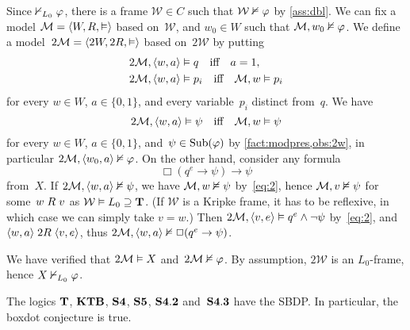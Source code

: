 \documentclass[leqno,draft,11pt]{article}
\def\sbc{SBDP}
\let\frm\mathcal
\begin{document}
\begin{Pf}
Since $\nvdash_{L_0}\varphi$, there is a frame $\frm W\in C$
such that $\frm W\nmodel\fii$ by \th\ref{ass:dbl}. We can fix a model $\frm
M=\p{W,R,{\model}}$ based on~$\frm W$, and $w_0\in W$ such that
$\frm M,w_0\nmodel\fii$. We define a model~$2\frm
M=\p{2W,2R,{\model}}$ based on~$2\frm W$ by putting
\begin{align*}
2\frm M,\p{w,a}&\model q\iff a=1,\\
2\frm M,\p{w,a}&\model p_i\iff\frm M,w\model p_i
\end{align*}
for every $w\in W$, $a\in\{0,1\}$, and every variable~$p_i$ distinct
from~$q$. We have
\begin{equation}\label{eq:2}
2\frm M,\p{w,a}\model\psi\iff\frm M,w\model\psi
\end{equation}
for every $w\in W$, $a\in\{0,1\}$, and~$\psi\in\operatorname{Sub}(\varphi)$ by
\th\ref{fact:modpres,obs:2w}, in particular $2\frm M,\p{w_0,a}\nmodel\fii$.
On the other hand, consider any formula
\[\Box(q^e\to\psi)\to\psi\]
from~$X$. If $2\frm M,\p{w,a}\nmodel\psi$, we have $\frm M,w\nmodel\psi$
by~\eqref{eq:2}, hence $\frm M,v\nmodel\psi$ for some~$w\mathrel Rv$ as $\frm
W\model L_0\Sset\lgc T$. (If $\frm W$ is a Kripke frame, it has to be
reflexive, in which case we can simply take $v=w$.) Then
$2\frm M,\p{v,e}\model q^e\land\neg\psi$ by~\eqref{eq:2}, and
$\langle w,a\rangle\mathrel{2R}\langle v,e\rangle$, thus $2\frm M,\p{w,a}\nmodel\Box(q^e\to\psi)$.

We have verified that $2\frm M\model X$ and~$2\frm M\nmodel\fii$. By
assumption, $2\frm W$ is an $L_0$-frame, hence $X\nvdash_{L_0}\varphi$.
\end{Pf}

\begin{Cor}\th\label{cor:bdc}
The logics $\mathbf T$, $\mathbf{KTB}$, $\mathbf{S4}$, $\mathbf{S5}$, $\mathbf{S4.2}$
and~$\mathbf{S4.3}$ have the \sbc.
In particular, the boxdot conjecture is true.
\noproof\end{Cor}
\end{document}
